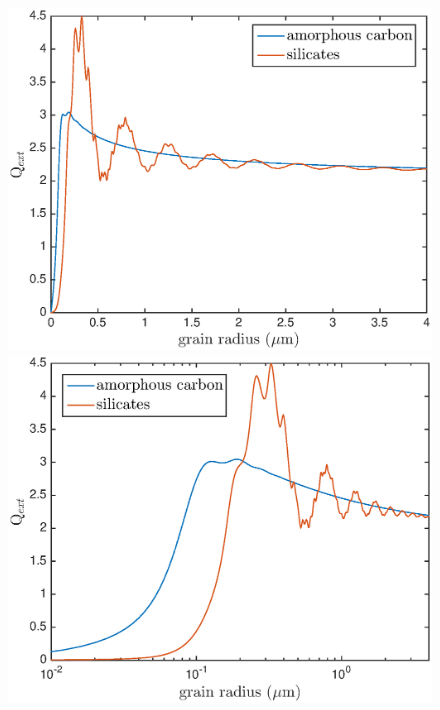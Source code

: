 \documentclass[useAMS,usenatbib,usegraphicx]{mnras}
\begin{document}
\begin{figure}
\centering
\includegraphics[trim=0 0 0 0,clip=true,scale=0.42]{Qext_grainsize_upto4}
\hspace{3mm}
\includegraphics[trim = 0 0 0 0,clip=true,scale=0.42]{Qext_grainsize_upto4_log}
\\
\hspace{0.001mm}

\end{figure}
\end{document}

